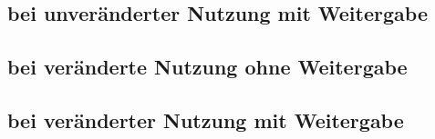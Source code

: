 \documentclass[DIV=calc,BCOR=5mm,11pt,headings=small,oneside,toc=bib]{scrbook}
\begin{document}
\subsection{bei unveränderter Nutzung mit Weitergabe}

\subsection{bei veränderte Nutzung ohne Weitergabe}

\subsection{bei veränderter Nutzung mit Weitergabe}

\small


\printnomenclature

\end{document}
